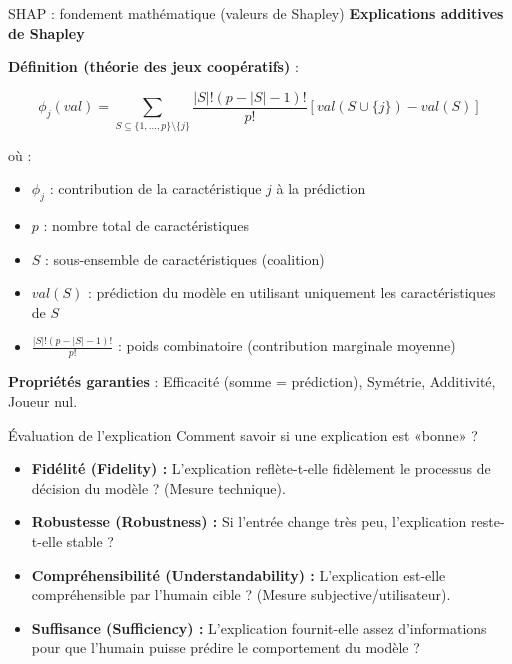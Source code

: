 \documentclass[9pt, aspectratio=169]{beamer}
\begin{document}
\begin{frame}{SHAP : fondement mathématique (valeurs de Shapley)}
    \textbf{Explications additives de Shapley}
    
    \vspace{0.3cm}
    \textbf{Définition (théorie des jeux coopératifs)} :
    
    \[
    \phi_j(val) = \sum_{S \subseteq \{1,\ldots,p\} \setminus \{j\}} \frac{|S|!(p-|S|-1)!}{p!} \left[ val(S \cup \{j\}) - val(S) \right]
    \]
    
    \vspace{0.2cm}
    où :
    \begin{itemize}
        \item \(\phi_j\) : contribution de la caractéristique \(j\) à la prédiction
        \item \(p\) : nombre total de caractéristiques
        \item \(S\) : sous-ensemble de caractéristiques (coalition)
        \item \(val(S)\) : prédiction du modèle en utilisant uniquement les caractéristiques de \(S\)
        \item \(\frac{|S|!(p-|S|-1)!}{p!}\) : poids combinatoire (contribution marginale moyenne)
    \end{itemize}
    
    \vspace{0.2cm}
    \textbf{Propriétés garanties} : Efficacité (somme = prédiction), Symétrie, Additivité, Joueur nul.
\end{frame}

\begin{frame}{Évaluation de l'explication}
    Comment savoir si une explication est «bonne» ? \parencite{Burkart2021}
    \begin{itemize}
        \item \textbf{Fidélité (Fidelity) :} L'explication reflète-t-elle fidèlement le processus de décision du modèle ? (Mesure technique).
        \item \textbf{Robustesse (Robustness) :} Si l'entrée change très peu, l'explication reste-t-elle stable ?
        \item \textbf{Compréhensibilité (Understandability) :} L'explication est-elle compréhensible par l'humain cible ? (Mesure subjective/utilisateur).
        \item \textbf{Suffisance (Sufficiency) :} L'explication fournit-elle assez d'informations pour que l'humain puisse prédire le comportement du modèle ?
    \end{itemize}
\end{frame}
\end{document}
